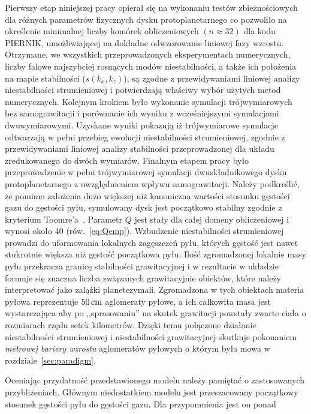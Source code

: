 %
\par Pierwszy etap niniejszej pracy opierał się na wykonaniu testów
zbieżnościowych dla różnych parametrów fizycznych dysku protoplanetarnego co
pozwoliło na określenie minimalnej liczby komórek obliczeniowych $(n\approx32)$
dla kodu \textsc{PIERNIK}, umożliwiającej na dokładne odwzorowanie liniowej fazy
wzrostu.  Otrzymane, we wszystkich przeprowadzonych eksperymentach numerycznych,
liczby falowe najszybciej rosnących modów niestabilności, a także ich położenia na
mapie stabilności ($s(k_x, k_z)$), są zgodne z przewidywaniami liniowej analizy
niestabilności strumieniowej i potwierdzają właściwy wybór użytych metod
numerycznych. Kolejnym krokiem było wykonanie symulacji trójwymiarowych bez
samograwitacji i porównanie ich wyniku z wcześniejszymi symulacjami
dwuwymiarowymi. Uzyskane wyniki pokazują iż trójwymiarowe symulacje odtwarzają w
pełni przebieg ewolucji niestabilności strumieniowej, zgodnie z przewidywaniami
liniowej analizy stabilności przeprowadzonej dla układu zredukowanego do dwóch
wymiarów. Finalnym etapem pracy było przeprowadzenie w pełni trójwymiarowej
symulacji dwuskładnikowego dysku protoplanetarnego z uwzględnieniem wpływu
samograwitacji. Należy podkreślić, że pomimo założenia dużo większej niż
kanoniczna wartości stosunku gęstości gazu do gęstości pyłu, symulowany dysk
jest początkowo stabilny zgodnie z kryterium Toomre'a~.
Parametr $Q$ jest stały dla całej domeny obliczeniowej i wynosi około $40$
(rów.~\ref{eq:Qemp}). Wzbudzenie niestabilności strumieniowej prowadzi do
uformowania lokalnych zagęszczeń pyłu, których gęstość jest nawet stukrotnie
większa niż gęstość początkowa pyłu. Ilość zgromadzonej lokalnie masy pyłu
przekracza granicę stabilności grawitacyjnej i w rezultacie w układzie formuje
się znaczna liczba związanych grawitacyjnie obiektów, które należy interpretować
jako zalążki planetezymali. Zgromadzona w tych obiektach materia
pyłowa reprezentuje $50\hbox{$\thinspace\textrm{cm}$}$ aglomeraty pyłowe, a ich całkowita masa jest
wystarczająca aby po ,,sprasowaniu'' na skutek grawitacji powstały zwarte ciała o
rozmiarach rzędu setek kilometrów. Dzięki temu połączone działanie
niestabilności strumieniowej i niestabilności grawitacyjnej skutkuje pokonaniem
\emph{metrowej bariery wzrostu} aglomeratów pyłowych o którym była mowa w
rozdziale~\ref{sec:paradigm}.
%
\par 
Oceniając przydatność przedstawionego modelu należy pamiętać o zastosowanych
przybliżeniach. Głównym niedostatkiem modelu jest przeszacowany początkowy
stosunek gęstości pyłu do gęstości gazu. Dla przypomnienia jest on ponad
